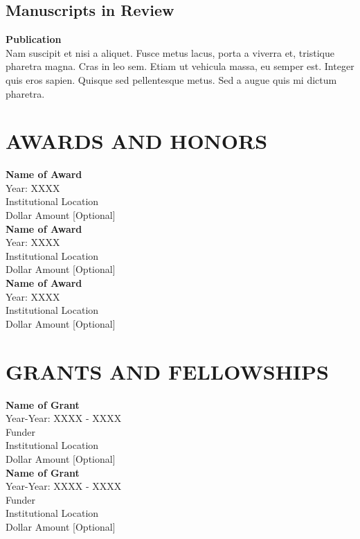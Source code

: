 \documentclass{article}
\begin{document}
\subsection*{Manuscripts in Review}
\textbf{Publication} \\ 
Nam suscipit et nisi a aliquet. Fusce metus lacus, porta a viverra et, tristique pharetra magna. Cras in leo sem. Etiam ut vehicula massa, eu semper est. Integer quis eros sapien. Quisque sed pellentesque metus. Sed a augue quis mi dictum pharetra. 


\section*{AWARDS AND HONORS}

\noindent
\newline
\textbf{Name of Award} \\
Year: XXXX \\
Institutional Location \\
Dollar Amount [Optional]  \\

\noindent
\textbf{Name of Award} \\
Year: XXXX \\
Institutional Location \\
Dollar Amount [Optional]  \\

\noindent
\textbf{Name of Award} \\
Year: XXXX \\
Institutional Location \\
Dollar Amount [Optional]  


\section*{GRANTS AND FELLOWSHIPS}

\noindent
\newline 
\textbf{Name of Grant} \\
Year-Year: XXXX - XXXX\\
Funder \\
Institutional Location \\
Dollar Amount [Optional]  \\

\noindent
\textbf{Name of Grant} \\ 
Year-Year: XXXX - XXXX\\
Funder \\
Institutional Location \\
Dollar Amount [Optional]  \\
\end{document}
